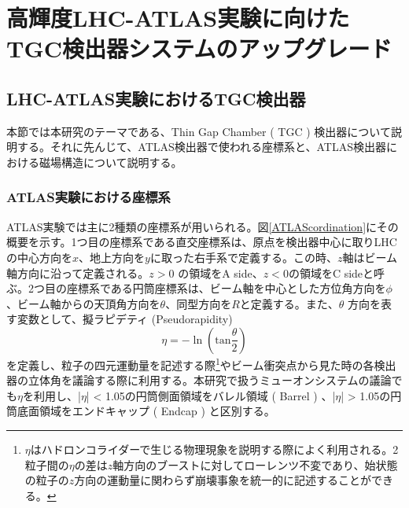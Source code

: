 \chapter{高輝度LHC-ATLAS実験に向けたTGC検出器システムのアップグレード}
\label{chap_TGC}




\section{LHC-ATLAS実験におけるTGC検出器}
本節では本研究のテーマである、Thin Gap Chamber ( TGC ) 検出器について説明する。それに先んじて、ATLAS検出器で使われる座標系と、ATLAS検出器における磁場構造について説明する。

\subsection{ATLAS実験における座標系}
\label{subsec_ATLAScordination}
ATLAS実験では主に2種類の座標系が用いられる。図\ref{ATLAScordination}にその概要を示す。1つ目の座標系である直交座標系は、原点を検出器中心に取りLHCの中心方向を$x$、地上方向を$y$に取った右手系で定義する。この時、$z$軸はビーム軸方向に沿って定義される。$z>0$ の領域をA side、$z<0$の領域をC sideと呼ぶ。2つ目の座標系である円筒座標系は、ビーム軸を中心とした方位角方向を$\phi$、ビーム軸からの天頂角方向を$\theta$、同型方向を$R$と定義する。また、$\theta$ 方向を表す変数として、擬ラピデティ  (Pseudorapidity)
\begin{equation}
    \eta = -\ln(\mathrm{tan}\frac{\theta}{2})
\end{equation}
を定義し、粒子の四元運動量を記述する際\footnote{$\eta$はハドロンコライダーで生じる物理現象を説明する際によく利用される。2粒子間の$\eta$の差は$z$軸方向のブーストに対してローレンツ不変であり、始状態の粒子の$z$方向の運動量に関わらず崩壊事象を統一的に記述することができる。}やビーム衝突点から見た時の各検出器の立体角を議論する際に利用する。本研究で扱うミューオンシステムの議論でも$\eta$を利用し、|$\eta$| < 1.05の円筒側面領域をバレル領域 ( Barrel ) 、|$\eta$| > 1.05の円筒底面領域をエンドキャップ ( Endcap ) と区別する。

